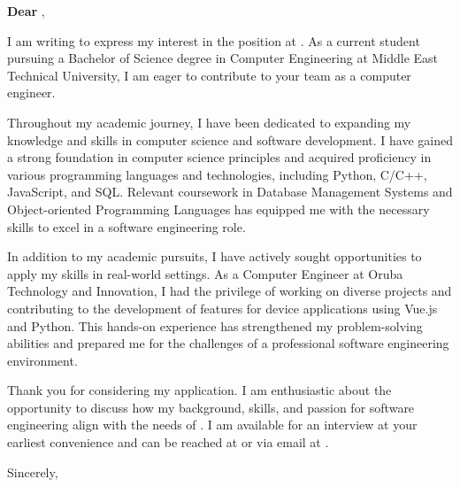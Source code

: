 \documentclass{article}
\begin{document}
\begin{center}
    \textbf{Dear \HiringManager},
\end{center}

I am writing to express my interest in the \PositionTitle position at \CompanyName. As a current student pursuing a Bachelor of Science degree in Computer Engineering at Middle East Technical University, I am eager to contribute to your team as a computer engineer.

Throughout my academic journey, I have been dedicated to expanding my knowledge and skills in computer science and software development. I have gained a strong foundation in computer science principles and acquired proficiency in various programming languages and technologies, including Python, C/C++, JavaScript, and SQL. Relevant coursework in Database Management Systems and Object-oriented Programming Languages has equipped me with the necessary skills to excel in a software engineering role.

In addition to my academic pursuits, I have actively sought opportunities to apply my skills in real-world settings. As a Computer Engineer at Oruba Technology and Innovation, I had the privilege of working on diverse projects and contributing to the development of features for device applications using Vue.js and Python. This hands-on experience has strengthened my problem-solving abilities and prepared me for the challenges of a professional software engineering environment.

Thank you for considering my application. I am enthusiastic about the opportunity to discuss how my background, skills, and passion for software engineering align with the needs of \CompanyName. I am available for an interview at your earliest convenience and can be reached at \YourPhoneNumber or via email at \YourEmailAddress.

Sincerely,

\YourName
\end{document}
